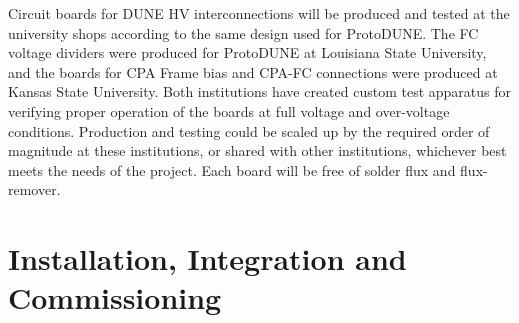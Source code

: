 Circuit boards for DUNE HV interconnections will be produced and tested at the  university shops according to the same design used for ProtoDUNE.  The FC voltage dividers were produced for ProtoDUNE at Louisiana State University, and the boards for CPA Frame bias and CPA-FC connections were produced at Kansas State University.
Both institutions have created custom test apparatus for verifying proper operation of the boards at full voltage and over-voltage conditions.  Production and testing could be
scaled up by the required order of magnitude at these institutions, or shared with
other institutions, whichever best meets the needs of the project.
Each board will be free of solder flux and flux-remover. 


%
%
%
%
%
%
%
%
%
%
\section{Installation, Integration and Commissioning}
\label{sec:fdsp-hv-install}

